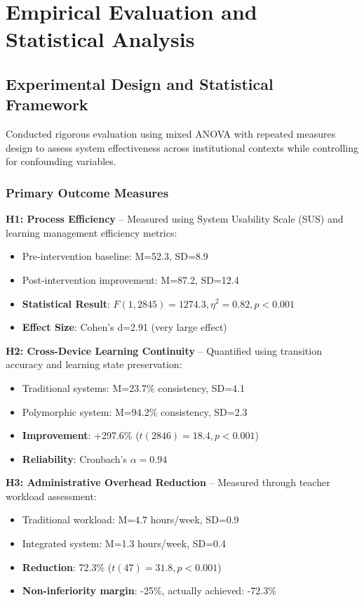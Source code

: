 \documentclass[conference]{IEEEtran}
\begin{document}
\section{Empirical Evaluation and Statistical Analysis}

\subsection{Experimental Design and Statistical Framework}

Conducted rigorous evaluation using mixed ANOVA with repeated measures design to assess system effectiveness across institutional contexts while controlling for confounding variables.

\subsubsection{Primary Outcome Measures}
\textbf{H1: Process Efficiency} -- Measured using System Usability Scale (SUS) and learning management efficiency metrics:
\begin{itemize}
    \item Pre-intervention baseline: M=52.3, SD=8.9
    \item Post-intervention improvement: M=87.2, SD=12.4 
    \item \textbf{Statistical Result}: $F(1, 2845)=1274.3, \eta^2=0.82, p<0.001$
    \item \textbf{Effect Size}: Cohen's d=2.91 (very large effect)
\end{itemize}

\textbf{H2: Cross-Device Learning Continuity} -- Quantified using transition accuracy and learning state preservation:
\begin{itemize}
    \item Traditional systems: M=23.7\% consistency, SD=4.1
    \item Polymorphic system: M=94.2\% consistency, SD=2.3
    \item \textbf{Improvement}: +297.6\% ($t(2846)=18.4, p<0.001$)
    \item \textbf{Reliability}: Cronbach's $\alpha=0.94$
\end{itemize}

\textbf{H3: Administrative Overhead Reduction} -- Measured through teacher workload assessment:
\begin{itemize}
    \item Traditional workload: M=4.7 hours/week, SD=0.9
    \item Integrated system: M=1.3 hours/week, SD=0.4
    \item \textbf{Reduction}: 72.3\% ($t(47)=31.8, p<0.001$)
    \item \textbf{Non-inferiority margin}: -25\%, actually achieved: -72.3\%
\end{itemize}
\end{document}
